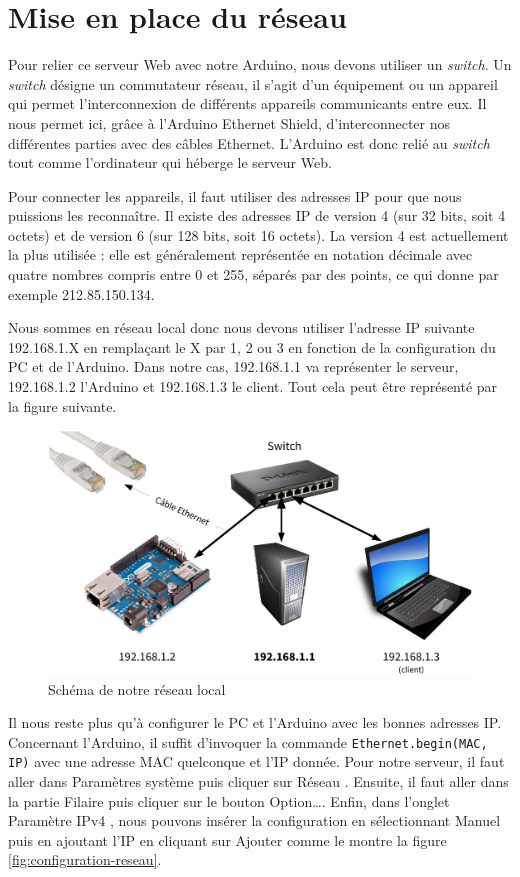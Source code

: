\section{Mise en place du réseau}

Pour relier ce serveur Web avec notre Arduino, nous devons utiliser un \emph{switch}. Un \emph{switch} désigne un commutateur réseau, il s'agit d'un équipement ou un appareil qui permet l'interconnexion de différents appareils communicants entre eux. Il nous permet ici, grâce à l'Arduino Ethernet Shield, d'interconnecter nos différentes parties avec des câbles Ethernet. L'Arduino est donc relié au \emph{switch} tout comme l'ordinateur qui héberge le serveur Web.

Pour connecter les appareils, il faut utiliser des adresses IP pour que nous puissions les reconnaître. Il existe des adresses IP de version 4 (sur 32 bits, soit 4 octets) et de version 6 (sur 128 bits, soit 16 octets). La version 4 est actuellement la plus utilisée : elle est généralement représentée en notation décimale avec quatre nombres compris entre 0 et 255, séparés par des points, ce qui donne par exemple 212.85.150.134.

Nous sommes en réseau local donc nous devons utiliser l'adresse IP suivante 192.168.1.X en remplaçant le X par 1, 2 ou 3 en fonction de la configuration du PC et de l'Arduino. Dans notre cas, 192.168.1.1 va représenter le serveur, 192.168.1.2 l'Arduino et 192.168.1.3 le client. Tout cela peut être représenté par la figure suivante.

\begin{figure}[!h]
	\centering
	\includegraphics[width=.8\linewidth]{Images/Schema_reseau}
	\caption{Schéma de notre réseau local}
\end{figure}

Il nous reste plus qu'à configurer le PC et l'Arduino avec les bonnes adresses IP. Concernant l'Arduino, il suffit d'invoquer la commande \verb-Ethernet.begin(MAC, IP)- avec une adresse MAC quelconque et l'IP donnée. Pour notre serveur, il faut aller dans \og Paramètres système \fg{} puis cliquer sur \og Réseau \fg. Ensuite, il faut aller dans la partie \og Filaire \fg{} puis cliquer sur le bouton \og Option\dots \fg. Enfin, dans l'onglet \og Paramètre IPv4 \fg, nous pouvons insérer la configuration en sélectionnant \og Manuel \fg{} puis en ajoutant l'IP en cliquant sur \og Ajouter \fg{} comme le montre la figure \ref{fig:configuration-reseau}.

